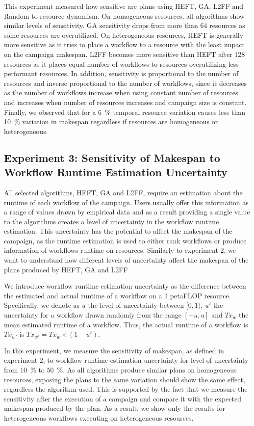 This experiment measured how sensitive are plans using HEFT, GA, L2FF and
Random to resource dynamism. On homogeneous resources, all algorithms show
similar levels of sensitivity. GA sensitivity drops from more than 64
resources as some resources are overutilized. On heterogeneous resources, HEFT
is generally more sensitive as it tries to place a workflow to a resource with
the least impact on the campaign makespan. L2FF becomes more sensitive than
HEFT after 128 resources as it places equal number of workflows to resources
overutilizing less performant resources. In addition, sensitivity is
proportional to the number of resources and inverse proportional to the number
of workflows, since it decreases as the number of workflows increase when
using constant number of resources and increases when number of resources
increases and campaign size is constant. Finally, we observed that for a 6~\%
temporal resource variation causes less than 10~\% variation in makespan
regardless if resources are homogeneous or heterogeneous.

\subsection{Experiment 3: Sensitivity of Makespan to Workflow Runtime Estimation Uncertainty}

All selected algorithms, HEFT, GA and L2FF, require an estimation about the
runtime of each workflow of the campaign. Users usually offer this information
as a range of values drawn by empirical data and as a result providing a
single value to the algorithms creates a level of uncertainty in the workflow
runtime estimation. This uncertainty has the potential to affect the makespan
of the campaign, as the runtime estimation is used to either rank workflows or
produce information of workflows runtime on resources. Similarly to experiment
2, we want to understand how different levels of uncertainty affect the
makespan of the plans produced by HEFT, GA and L2FF

We introduce workflow runtime estimation uncertainty as the difference between
the estimated and actual runtime of a workflow on a 1 petaFLOP resource.
Specifically, we denote as $u$ the level of uncertainty between $[0,1)$, $u'$
the uncertainty for a workflow drawn randomly from the range $[-u,u]$ and
$Tx_{w}$ the mean estimated runtime of a workflow. Thus, the actual runtime of
a workflow is $Tx_{w'}$ is $ Tx_{w'} = Tx_{w} \times (1-u')$.

In this experiment, we measure the sensitivity of makespan, as defined in
experiment 2, to workflow runtime estimation uncertainty for level of
uncertainty from 10~\% to 50~\%. As all algorithms produce similar plans on
homogeneous resources, exposing the plans to the same variation should show
the same effect, regardless the algorithm used. This is supported by the fact
that we measure the sensitivity after the execution of a campaign and compare
it with the expected makespan produced by the plan. As a result, we show only
the results for heterogeneous workflows executing on heterogeneous resources.

